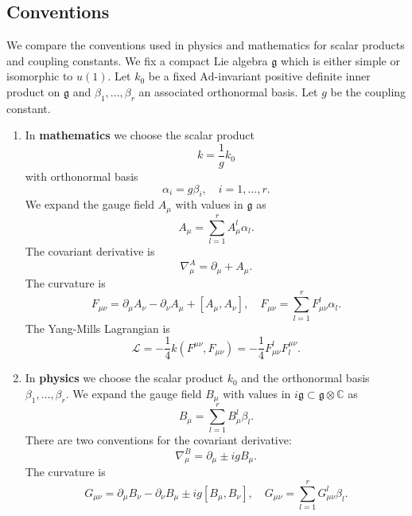 \documentclass[12pt]{amsart}
\theoremstyle{definition}
\theoremstyle{remark}
\numberwithin{equation}{section}
\begin{document}
\subsection{Conventions} We compare the conventions used in physics and mathematics for scalar products and coupling constants. We fix a compact Lie algebra $\mathfrak{g}$ which is either simple or isomorphic to $u(1)$. Let $k_0$ be a fixed $\mathrm{Ad}$-invariant positive definite inner product on $\mathfrak{g}$ and $\beta_1,\ldots,\beta_r$ an associated orthonormal basis. Let $g$ be the coupling constant.
\begin{enumerate}
\item In {\bf mathematics} we choose the scalar product
\begin{equation*}
k=\frac{1}{g}k_0
\end{equation*}
with orthonormal basis
\begin{equation*}
\alpha_i=g\beta_i,\quad i=1,\ldots,r.
\end{equation*}
We expand the gauge field $A_\mu$ with values in $\mathfrak{g}$ as
\begin{equation*}
A_\mu=\sum_{l=1}^rA_\mu^l\alpha_l.
\end{equation*}
The covariant derivative is
\begin{equation*}
\nabla_\mu^A=\partial_\mu+A_\mu.
\end{equation*}
The curvature is
\begin{equation*}
F_{\mu\nu}=\partial_\mu A_\nu-\partial_\nu A_\mu+[A_\mu,A_\nu],\quad F_{\mu\nu}=\sum_{l=1}^rF_{\mu\nu}^l\alpha_l.
\end{equation*}
The Yang-Mills Lagrangian is
\begin{equation*}
\mathcal{L}=-\frac{1}{4}k(F^{\mu\nu},F_{\mu\nu})=-\frac{1}{4}F_{\mu\nu}^lF^{\mu\nu}_l.
\end{equation*}
\item In {\bf physics} we choose the scalar product $k_0$ and the orthonormal basis $\beta_1,\ldots,\beta_r$. We expand the gauge field $B_\mu$ with values in $i\mathfrak{g}\subset\mathfrak{g}\otimes\mathbb{C}$ as
\begin{equation*}
B_\mu=\sum_{l=1}^rB_\mu^l\beta_l.
\end{equation*}
There are two conventions for the covariant derivative:
\begin{equation*}
\nabla_\mu^B=\partial_\mu\pm igB_\mu.
\end{equation*}
The curvature is
\begin{equation*}
G_{\mu\nu}=\partial_\mu B_\nu-\partial_\nu B_\mu\pm ig[B_\mu,B_\nu],\quad G_{\mu\nu}=\sum_{l=1}^rG_{\mu\nu}^l\beta_l.

\end{equation*}
\end{enumerate}
\end{document}
